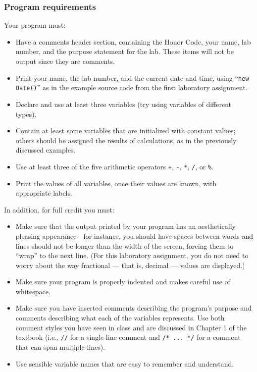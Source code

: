 \subsubsection*{Program requirements}
\noindent Your program must:
\begin{itemize}
\item
Have a  comments header section, containing the Honor Code, your name, lab number, and the purpose statement for the lab.
These items will not be output since they are comments.
\item
Print your name, the lab number, and the current date and time, using
``{\tt new Date()}'' as in the example source code from the first laboratory assignment.
\item
Declare and use at least three variables (try using variables of different types).
\item
Contain at least some variables that are initialized with constant values; others
should be assigned the results of calculations, as in the previously discussed examples.
\item
Use at least three of the five arithmetic operators \verb$+$, \verb$-$, \verb$*$,
\verb$/$, or \verb$%$.
\item
Print the values of all variables, once their values are known, with appropriate labels.
\end{itemize}


\noindent In addition, for full credit you must:
\begin{itemize}

\item Make sure that the output printed by your program has an aesthetically pleasing appearance---for instance, you
  should have spaces between words and lines should not be longer than the width of the screen, forcing them to ``wrap''
  to the next line. (For this laboratory assignment, you do not need to worry about the way fractional --- that is,
  decimal --- values are displayed.)

\item Make sure your program is properly indented and makes careful use of whitespace.

\item Make sure you have inserted comments describing the program's purpose and comments describing what each of the
  variables represents. Use both comment styles you have seen in class and are discussed in Chapter 1 of the textbook
  (i.e., {\tt //} for a single-line comment and {\tt /* ... */} for a comment that can span multiple lines).

\item Use sensible variable names that are easy to remember and understand.

\end{itemize}


